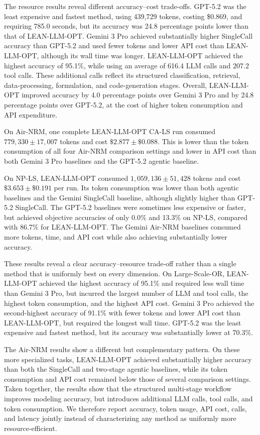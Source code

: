 \documentclass[11pt]{article}
\begin{document}
\begin{enumerate}[label=(R2.Major.\arabic*),leftmargin=*]
The resource results reveal different accuracy--cost trade-offs. GPT-5.2 was
the least expensive and fastest method, using 439,729 tokens, costing
\$0.869, and requiring 785.0 seconds, but its accuracy was 24.8 percentage
points lower than that of LEAN-LLM-OPT. Gemini 3 Pro achieved substantially
higher SingleCall accuracy than GPT-5.2 and used fewer tokens and lower API
cost than LEAN-LLM-OPT, although its wall time was longer. LEAN-LLM-OPT
achieved the highest accuracy of 95.1\%, while using an average of 616.4 LLM
calls and 207.2 tool calls. These additional calls reflect its structured
classification, retrieval, data-processing, formulation, and code-generation
stages. Overall, LEAN-LLM-OPT improved accuracy by 4.0 percentage points over
Gemini 3 Pro and by 24.8 percentage points over GPT-5.2, at the cost of
higher token consumption and API expenditure.

On Air-NRM, one complete LEAN-LLM-OPT CA-LS run consumed
$779{,}330\pm17{,}007$ tokens and cost
$\$2.877\pm\$0.088$. This is lower than the token consumption of all four
Air-NRM comparison settings and lower in API cost than both Gemini 3 Pro
baselines and the GPT-5.2 agentic baseline.

On NP-LS, LEAN-LLM-OPT consumed
$1{,}059{,}136\pm51{,}428$ tokens and cost
$\$3.653\pm\$0.191$ per run. Its token consumption was lower than both
agentic baselines and the Gemini SingleCall baseline, although slightly higher
than GPT-5.2 SingleCall. The GPT-5.2 baselines were sometimes less expensive
or faster, but achieved objective accuracies of only 0.0\% and 13.3\% on
NP-LS, compared with 86.7\% for LEAN-LLM-OPT. The Gemini Air-NRM baselines
consumed more tokens, time, and API cost while also achieving substantially
lower accuracy.

These results reveal a clear accuracy--resource trade-off rather than a single
method that is uniformly best on every dimension. On Large-Scale-OR,
LEAN-LLM-OPT achieved the highest accuracy of 95.1\% and required less wall
time than Gemini 3 Pro, but incurred the largest number of LLM and tool
calls, the highest token consumption, and the highest API cost. Gemini 3 Pro
achieved the second-highest accuracy of 91.1\% with fewer tokens and lower API
cost than LEAN-LLM-OPT, but required the longest wall time. GPT-5.2 was the
least expensive and fastest method, but its accuracy was substantially lower
at 70.3\%.

The Air-NRM results show a different but complementary pattern. On these more
specialized tasks, LEAN-LLM-OPT achieved substantially higher accuracy than
both the SingleCall and two-stage agentic baselines, while its token
consumption and API cost remained below those of several comparison settings.
Taken together, the results show that the structured multi-stage workflow
improves modeling accuracy, but introduces additional LLM calls, tool calls,
and token consumption. We therefore report accuracy, token usage, API cost,
calls, and latency jointly instead of characterizing any method as uniformly
more resource-efficient.


\end{enumerate}
\end{document}

